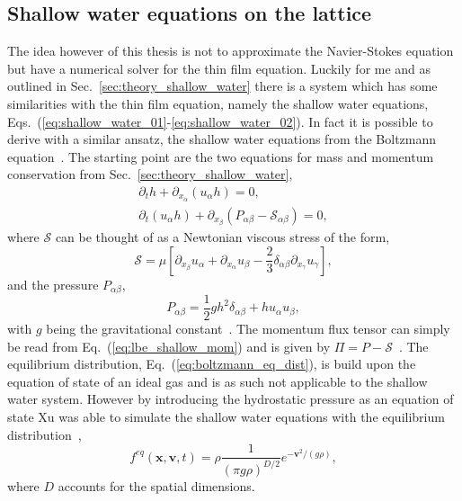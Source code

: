 \subsection{Shallow water equations on the lattice}\label{susbsec:shallow_water_lattice_boltzmann}

The idea however of this thesis is not to approximate the Navier-Stokes equation but have a numerical solver for the thin film equation.
Luckily for me and as outlined in Sec.~\ref{sec:theory_shallow_water} there is a system which has some similarities with the thin film equation, namely the shallow water equations, Eqs.~(\ref{eq:shallow_water_01}-\ref{eq:shallow_water_02}). 
In fact it is possible to derive with a similar ansatz, the shallow water equations from the Boltzmann equation~\cite{salmonLatticeBoltzmannMethod1999, zhouLatticeBoltzmannMethods2004, dellarNonhydrodynamicModesPriori2002}.
The starting point are the two equations for mass and momentum conservation from Sec.~\ref{sec:theory_shallow_water},
\begin{align}
    \partial_t h + \partial_{x_{\alpha}}(u_{\alpha}h) = 0, \label{eq:lbe_shallow_cont}\\
    \partial_t (u_{\alpha}h) + \partial_{x_{\beta}}(P_{\alpha\beta} - \mathcal{S}_{\alpha\beta}) = 0, \label{eq:lbe_shallow_mom}
\end{align}
where $\mathcal{S}$ can be thought of as a Newtonian viscous stress of the form,
\begin{equation}
    \mathcal{S} = \mu\left[\partial_{x_{\beta}}u_{\alpha} + \partial_{x_{\alpha}}u_{\beta} - \frac{2}{3}\delta_{\alpha\beta}\partial_{x_{\gamma}}u_{\gamma}\right],
\end{equation}
and the pressure $P_{\alpha\beta}$, 
\begin{equation}\label{eq:lbe_shallow_pressure}
    P_{\alpha\beta} = \frac{1}{2}g h^2\delta_{\alpha\beta} + h u_{\alpha}u_{\beta},
\end{equation}
with $g$ being the gravitational constant~\cite{salmonLatticeBoltzmannMethod1999}.
The momentum flux tensor can simply be read from Eq.~(\ref{eq:lbe_shallow_mom}) and is given by $\Pi = P - \mathcal{S}$~\cite{dellarNonhydrodynamicModesPriori2002}.
The equilibrium distribution, Eq.~(\ref{eq:boltzmann_eq_dist}), is build upon the equation of state of an ideal gas and is as such not applicable to the shallow water system. 
However by introducing the hydrostatic pressure as an equation of state Xu was able to simulate the shallow water equations with the equilibrium distribution~\cite{xuUNSPLITTINGBGKTYPESCHEMES1999, dellarNonhydrodynamicModesPriori2002},
\begin{equation}\label{eq:shallow_w_equilibrium}
    f^{eq}(\mathbf{x},\mathbf{v}, t) = \rho\frac{1}{(\pi g\rho)^{D/2}} e^{-\mathbf{v}^2/(g\rho)}, 
\end{equation}
where $D$ accounts for the spatial dimensions.

